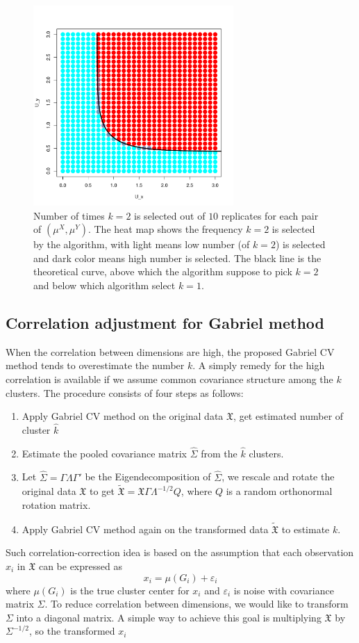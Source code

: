 \documentclass[12pt]{article}
\newcommand{\muX}{\mu^{X}}
\newcommand{\muY}{\mu^{Y}}
\newcommand{\dataX}{\mathfrak{X}}
\begin{document}
\begin{figure}[H]
\centering
\includegraphics[width=3in]{demo/overlap/color_plot.pdf}
\caption{Number of times $k=2$ is selected out of $10$ replicates for each pair of $(\muX, \muY)$. The heat map shows the frequency $k=2$ is selected by the algorithm, with light means low number (of $k=2$) is selected and dark color means high number is selected. The black line is the theoretical curve, above which the algorithm suppose to pick $k=2$ and below which algorithm select $k=1$.  }
\label{fig:overlap-color_plot}
\end{figure}

\subsection{Correlation adjustment for Gabriel method}
When the correlation between dimensions are high, the proposed Gabriel CV method tends to overestimate the number $k$. A simply remedy for the high correlation is available if we assume common covariance structure among the $k$ clusters. 
The procedure consists of four steps as follows:
\begin{enumerate}
	\item Apply Gabriel CV method on the original data $\dataX$, get estimated number of cluster $\hat{k}$
	\item Estimate the pooled covariance matrix $\hat{\Sigma}$ from the $\hat{k}$ clusters.
	\item Let $\hat{\Sigma} = \Gamma\Lambda\Gamma'$ be the Eigendecomposition of $\hat{\Sigma}$, we rescale and rotate the original data $\dataX$ to get $ \widetilde{\dataX} = \dataX\Gamma\Lambda^{-1/2}Q$, where $Q$ is a random  orthonormal rotation matrix. 
	\item Apply Gabriel CV method again on the transformed data $ \widetilde{\dataX}$ to estimate $k$. 
\end{enumerate}
Such correlation-correction idea is based on the assumption that each observation $x_i$ in $\dataX$ can be expressed as
\[	x_i = \mu(G_i)+\varepsilon_i \]
where $\mu(G_i)$ is the true cluster center for $x_i$ and $\varepsilon_i$ is noise with covariance matrix $\Sigma$. To reduce correlation between dimensions, we would like to transform $\Sigma$ into a diagonal matrix. A simple way to achieve this goal is multiplying $\dataX$ by $\Sigma^{-1/2}$, so the transformed $x_i$
\end{document}
